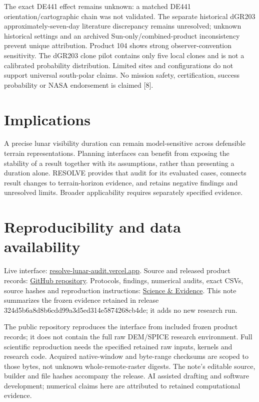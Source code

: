 \documentclass[conference,letterpaper]{IEEEtran}
\begin{document}
The exact DE441 effect remains unknown: a matched DE441 orientation/cartographic chain was not validated. The separate historical dGR203 approximately-seven-day literature discrepancy remains unresolved; unknown historical settings and an archived Sun-only/combined-product inconsistency prevent unique attribution. Product 104 shows strong observer-convention sensitivity. The dGR203 clone pilot contains only five local clones and is not a calibrated probability distribution. Limited sites and configurations do not support universal south-polar claims. No mission safety, certification, success probability or NASA endorsement is claimed [8].

\section{Implications}

A precise lunar visibility duration can remain model-sensitive across defensible terrain representations. Planning interfaces can benefit from exposing the stability of a result together with its assumptions, rather than presenting a duration alone. RESOLVE provides that audit for its evaluated cases, connects result changes to terrain-horizon evidence, and retains negative findings and unresolved limits. Broader applicability requires separately specified evidence.

\newpage

\section{Reproducibility and data availability}

Live interface: \href{https://resolve-lunar-audit.vercel.app/}{resolve-lunar-audit.vercel.app}. Source and released product records: \href{https://github.com/MangoMuffinLover/resolve-lunar-audit}{GitHub repository}. Protocols, findings, numerical audits, exact CSVs, source hashes and reproduction instructions: \href{https://resolve-lunar-audit.vercel.app/science/}{Science \& Evidence}. This note summarizes the frozen evidence retained in release 324d5b6a8d8b6cdd99a3d5ed314e5874268cb4de; it adds no new research run.

The public repository reproduces the interface from included frozen product records; it does not contain the full raw DEM/SPICE research environment. Full scientific reproduction needs the specified retained raw inputs, kernels and research code. Acquired native-window and byte-range checksums are scoped to those bytes, not unknown whole-remote-raster digests. The note's editable source, builder and file hashes accompany the release. AI assisted drafting and software development; numerical claims here are attributed to retained computational evidence.
\end{document}
